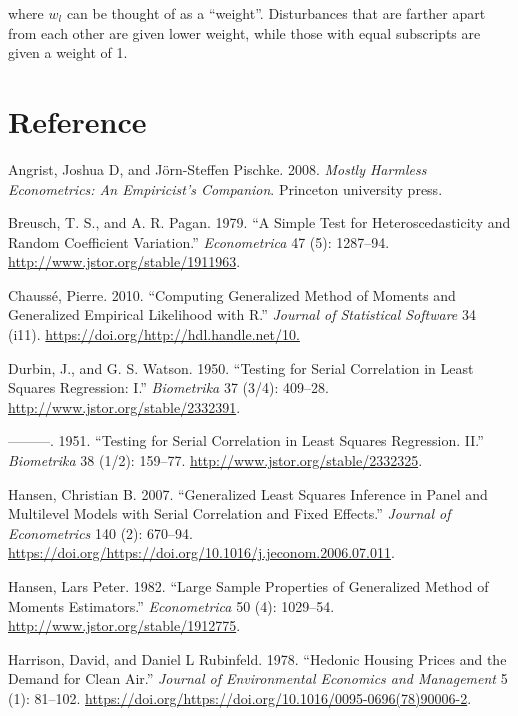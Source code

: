 \documentclass[
  12pt,
]{article}
\newlength{\cslhangindent}
\newenvironment{cslreferences}%
  {\setlength{\parindent}{0pt}%
  \everypar{\setlength{\hangindent}{\cslhangindent}}\ignorespaces}%
  {\par}
\begin{document}
where \(w_l\) can be thought of as a ``weight''. Disturbances that are farther apart from each other are given lower weight, while those with equal subscripts are given a weight of 1.

\hypertarget{reference}{%
\section{Reference}\label{reference}}

\hypertarget{refs}{}
\begin{cslreferences}
\leavevmode\hypertarget{ref-angrist2008mostly}{}%
Angrist, Joshua D, and Jörn-Steffen Pischke. 2008. \emph{Mostly Harmless Econometrics: An Empiricist's Companion}. Princeton university press.

\leavevmode\hypertarget{ref-BPG}{}%
Breusch, T. S., and A. R. Pagan. 1979. ``A Simple Test for Heteroscedasticity and Random Coefficient Variation.'' \emph{Econometrica} 47 (5): 1287--94. \url{http://www.jstor.org/stable/1911963}.

\leavevmode\hypertarget{ref-gmmR}{}%
Chaussé, Pierre. 2010. ``Computing Generalized Method of Moments and Generalized Empirical Likelihood with R.'' \emph{Journal of Statistical Software} 34 (i11). \url{https://doi.org/http://hdl.handle.net/10.}

\leavevmode\hypertarget{ref-DW1}{}%
Durbin, J., and G. S. Watson. 1950. ``Testing for Serial Correlation in Least Squares Regression: I.'' \emph{Biometrika} 37 (3/4): 409--28. \url{http://www.jstor.org/stable/2332391}.

\leavevmode\hypertarget{ref-DW2}{}%
---------. 1951. ``Testing for Serial Correlation in Least Squares Regression. II.'' \emph{Biometrika} 38 (1/2): 159--77. \url{http://www.jstor.org/stable/2332325}.

\leavevmode\hypertarget{ref-Hansen2007}{}%
Hansen, Christian B. 2007. ``Generalized Least Squares Inference in Panel and Multilevel Models with Serial Correlation and Fixed Effects.'' \emph{Journal of Econometrics} 140 (2): 670--94. \url{https://doi.org/https://doi.org/10.1016/j.jeconom.2006.07.011}.

\leavevmode\hypertarget{ref-Hansen1982}{}%
Hansen, Lars Peter. 1982. ``Large Sample Properties of Generalized Method of Moments Estimators.'' \emph{Econometrica} 50 (4): 1029--54. \url{http://www.jstor.org/stable/1912775}.

\leavevmode\hypertarget{ref-Boston}{}%
Harrison, David, and Daniel L Rubinfeld. 1978. ``Hedonic Housing Prices and the Demand for Clean Air.'' \emph{Journal of Environmental Economics and Management} 5 (1): 81--102. \url{https://doi.org/https://doi.org/10.1016/0095-0696(78)90006-2}.


\end{cslreferences}
\end{document}
